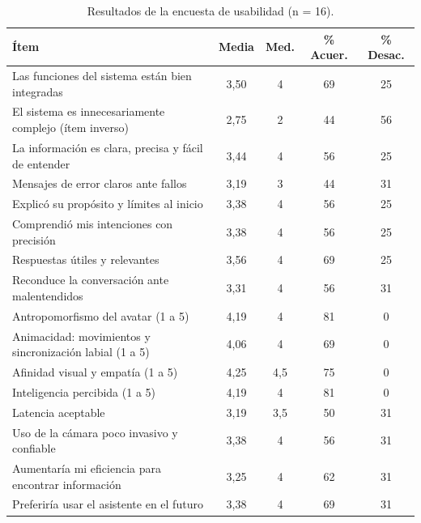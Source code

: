 \begin{table}[H]
  \caption{Resultados de la encuesta de usabilidad (n = 16).}
  \label{tab:usabilidad}
  \centering
  \small
  \setlength{\tabcolsep}{3.5pt}
  \renewcommand{\arraystretch}{1.15}
  \begin{tabular}{|>{\raggedright\arraybackslash}p{6.8cm}|c|c|c|c|}
    \hline
    \rowcolor[HTML]{EFEFEF}
    \textbf{Ítem} & \textbf{Media} & \textbf{Med.} & \textbf{\% Acuer.} & \textbf{\% Desac.} \\ \hline
    Las funciones del sistema están bien integradas & 3,50 & 4 & 69 & 25 \\ \hline
    El sistema es innecesariamente complejo (ítem inverso) & 2,75 & 2 & 44 & 56 \\ \hline
    La información es clara, precisa y fácil de entender & 3,44 & 4 & 56 & 25 \\ \hline
    Mensajes de error claros ante fallos & 3,19 & 3 & 44 & 31 \\ \hline
    Explicó su propósito y límites al inicio & 3,38 & 4 & 56 & 25 \\ \hline
    Comprendió mis intenciones con precisión & 3,38 & 4 & 56 & 25 \\ \hline
    Respuestas útiles y relevantes & 3,56 & 4 & 69 & 25 \\ \hline
    Reconduce la conversación ante malentendidos & 3,31 & 4 & 56 & 31 \\ \hline
    Antropomorfismo del avatar (1 a 5) & 4,19 & 4 & 81 & 0 \\ \hline
    Animacidad: movimientos y sincronización labial (1 a 5) & 4,06 & 4 & 69 & 0 \\ \hline
    Afinidad visual y empatía (1 a 5) & 4,25 & 4,5 & 75 & 0 \\ \hline
    Inteligencia percibida (1 a 5) & 4,19 & 4 & 81 & 0 \\ \hline
    Latencia aceptable & 3,19 & 3,5 & 50 & 31 \\ \hline
    Uso de la cámara poco invasivo y confiable & 3,38 & 4 & 56 & 31 \\ \hline
    Aumentaría mi eficiencia para encontrar información & 3,25 & 4 & 62 & 31 \\ \hline
    Preferiría usar el asistente en el futuro & 3,38 & 4 & 69 & 31 \\ \hline
  \end{tabular}
  \elaboradopor{\autorTFG}
\end{table}

